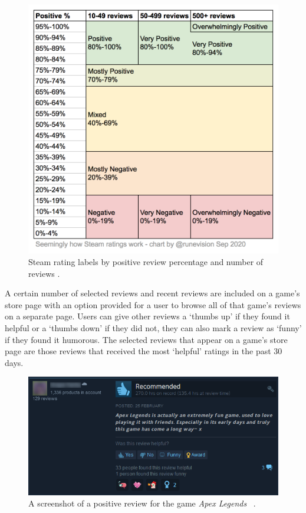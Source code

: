 \begin{figure}[ht]
    \centering
    \includegraphics[scale=0.3]{figures/02_background/02_SteamStore_Ratings.png}
    \caption{Steam rating labels by positive review percentage and number of reviews \cite{SteamRatingsChart}.}
    \label{fig:SteamStore_Ratings}
\end{figure}

A certain number of selected reviews and recent reviews are included on a game's store page with an option provided for a user to browse all of that game's reviews on a separate page. Users can give other reviews a `thumbs up' if they found it helpful or a `thumbs down' if they did not, they can also mark a review as `funny' if they found it humorous. The selected reviews that appear on a game's store page are those reviews that received the most `helpful' ratings in the past 30 days.

\begin{figure}[ht]
    \centering
    \includegraphics[scale=2.4]{figures/02_background/03_SteamStore_Review.png}
    \caption{A screenshot of a positive review for the game \textit{Apex Legends}\texttrademark~ \cite{SteamApexLegends}.}
    \label{fig:SteamStore_Review}
\end{figure}

